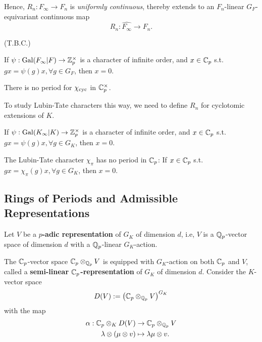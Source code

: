Hence, $R_n : F_\infty\to F_n$ is \textit{uniformly continuous},
thereby extends to an $F_n$-linear $G_F$-equivariant continuous map
\[R_n : \widehat{F_\infty}\to F_n.\]

(T.B.C.)

\begin{theorem}
    If $\psi : \operatorname{Gal}(F_\infty|F)\to\mathbb{Z}_p^\times$
    is a character of infinite order,
    and $x\in\mathbb{C}_p$ s.t. $gx = \psi(g)x, \forall g\in G_F$, then $x = 0$.
\end{theorem}

\begin{corollary}
    There is no period for $\chi_{\mathrm{cyc}}$ in $\mathbb{C}_p^\times$.
\end{corollary}

To study Lubin-Tate characters this way, we need to define $R_n$ for cyclotomic extensions of $K$.

\begin{corollary}
    If $\psi : \operatorname{Gal}(K_\infty|K)\to\mathbb{Z}_p^\times$
    is a character of infinite order,
    and $x\in\mathbb{C}_p$ s.t. $gx = \psi(g)x, \forall g\in G_K$, then $x = 0$.
\end{corollary}

\begin{corollary}
    The Lubin-Tate character $\chi_\pi$ has no period in $\mathbb{C}_p$:
    If $x\in\mathbb{C}_p$ s.t. $gx = \chi_\pi(g)x, \forall g\in G_K$, then $x = 0$.
\end{corollary}


\subsection{Rings of Periods and Admissible Representations}

Let $V$ be a \textbf{$p$-adic representation} of $G_K$ of dimension $d$, i.e, $V$ is a $\mathbb{Q}_p$-vector space of dimension $d$ with a $\mathbb{Q}_p$-linear $G_K$-action.

The $\mathbb{C}_p$-vector space $\mathbb{C}_p\otimes_{\mathbb{Q}_p} V$ is equipped with $G_K$-action on both $\mathbb{C}_p$ and $V$,
called a \textbf{semi-linear $\mathbb{C}_p$-representation} of $G_K$ of dimension $d$.
Consider the $K$-vector space \[D(V) := \left( \mathbb{C}_p\otimes_{\mathbb{Q}_p} V  \right)^{G_K}\]
with the map \begin{align*}
    \alpha : \mathbb{C}_p\otimes_{K} D(V)&\to \mathbb{C}_p\otimes_{\mathbb{Q}_p} V\\
    \lambda\otimes(\mu\otimes v)&\mapsto \lambda\mu\otimes v.
\end{align*}



